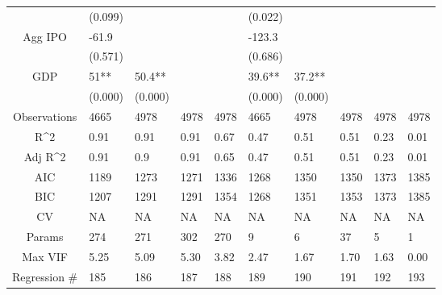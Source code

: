 \documentclass{article}
\begin{document}
\begin{table}[H]
\begin{tabular}{|clllllllll|}
   & (0.099) &  &  &  & (0.022) &  &  &  &  \\
  Agg IPO & -61.9 &  &  &  & -123.3 &  &  &  &  \\
   & (0.571) &  &  &  & (0.686) &  &  &  &  \\
  GDP & 51** & 50.4** &  &  & 39.6** & 37.2** &  &  &  \\
   & (0.000) & (0.000) &  &  & (0.000) & (0.000) &  &  &  \\
  \hline
 Observations & 4665 & 4978 & 4978 & 4978 & 4665 & 4978 & 4978 & 4978 & 4978 \\
  R^2 & 0.91 & 0.91 & 0.91 & 0.67 & 0.47 & 0.51 & 0.51 & 0.23 & 0.01 \\
  Adj R^2 & 0.91 & 0.9 & 0.91 & 0.65 & 0.47 & 0.51 & 0.51 & 0.23 & 0.01 \\
  AIC & 1189 & 1273 & 1271 & 1336 & 1268 & 1350 & 1350 & 1373 & 1385 \\
  BIC & 1207 & 1291 & 1291 & 1354 & 1268 & 1351 & 1353 & 1373 & 1385 \\
  CV & NA & NA & NA & NA & NA & NA & NA & NA & NA \\
  Params & 274 & 271 & 302 & 270 & 9 & 6 & 37 & 5 & 1 \\
  Max VIF & 5.25 & 5.09 & 5.30 & 3.82 & 2.47 & 1.67 & 1.70 & 1.63 & 0.00 \\
  Regression \# & 185 & 186 & 187 & 188 & 189 & 190 & 191 & 192 & 193 \\
   \hline
\end{tabular}

\end{table}
\end{document}
